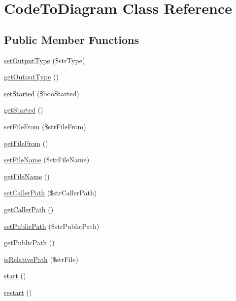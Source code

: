 \hypertarget{class_code_to_diagram}{
\section{CodeToDiagram Class Reference}
\label{class_code_to_diagram}
}
\subsection*{Public Member Functions}
\begin{CompactItemize}
\item 
\hyperlink{class_code_to_diagram_b16859ecf5ce7dead56b77cbef45c8bd}{setOutputType} (\$strType)
\item 
\hyperlink{class_code_to_diagram_04fb2bc09c8adb24bf9c585bb4dee691}{getOutputType} ()
\item 
\hyperlink{class_code_to_diagram_2aeb1b7ec5740287e34c15209fab8b78}{setStarted} (\$booStarted)
\item 
\hyperlink{class_code_to_diagram_177cc628e31a482237aed841078a122f}{getStarted} ()
\item 
\hyperlink{class_code_to_diagram_21031a5ba5b1de38288f09247a4bc413}{setFileFrom} (\$strFileFrom)
\item 
\hyperlink{class_code_to_diagram_8fea886bcd0b31bd46eca66b26dd18b8}{getFileFrom} ()
\item 
\hyperlink{class_code_to_diagram_14fd91733dbcc57d74df9c22e0c84e72}{setFileName} (\$strFileName)
\item 
\hyperlink{class_code_to_diagram_fdeebfe3fcf5806fc79c074a6a3a6eb1}{getFileName} ()
\item 
\hyperlink{class_code_to_diagram_bdded6991e674ce82f04f701972ebf9f}{setCallerPath} (\$strCallerPath)
\item 
\hyperlink{class_code_to_diagram_a8c839c9d33ebad153541a31ffc7ef3e}{getCallerPath} ()
\item 
\hyperlink{class_code_to_diagram_261f2bb173e655f2ead64eda4c29e76a}{setPublicPath} (\$strPublicPath)
\item 
\hyperlink{class_code_to_diagram_74df99a19bc54d630a15e1778144eb31}{getPublicPath} ()
\item 
\hyperlink{class_code_to_diagram_951b7900d3c0a1ffaeda89963456441c}{isRelativePath} (\$strFile)
\item 
\hyperlink{class_code_to_diagram_f8fa59992209e36dccb3eefb0f75531f}{start} ()
\item 
\hyperlink{class_code_to_diagram_c8de9e38ce27c87f710dff42a13455cf}{restart} ()

\end{CompactItemize}

